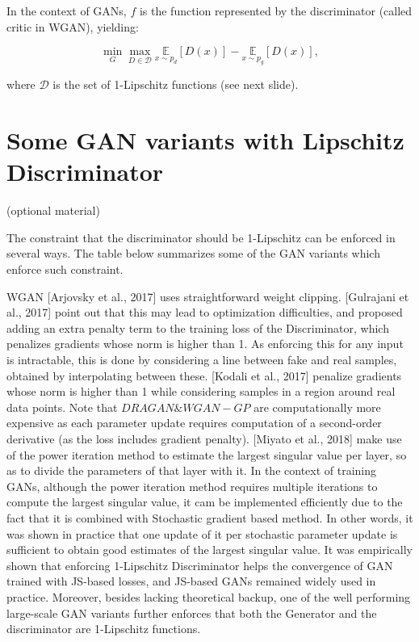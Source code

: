 \documentclass[10pt]{article}
\begin{document}
In the context of GANs, $f$ is the function represented by the discriminator (called critic in WGAN), yielding:

$$
\min _{G} \max _{D \in \mathcal{D}} \underset{x \sim p_{d}}{\mathbb{E}}[D(x)]-\underset{x \sim p_{g}}{\mathbb{E}}[D(x)],
$$

where $\mathcal{D}$ is the set of 1-Lipschitz functions (see next slide).

\section*{Some GAN variants with Lipschitz Discriminator}
(optional material)

The constraint that the discriminator should be 1-Lipschitz can be enforced in several ways. The table below summarizes some of the GAN variants which enforce such constraint.

WGAN [Arjovsky et al., 2017] uses straightforward weight clipping. [Gulrajani et al., 2017] point out that this may lead to optimization difficulties, and proposed adding an extra penalty term to the training loss of the Discriminator, which penalizes gradients whose norm is higher than 1. As enforcing this for any input is intractable, this is done by considering a line between fake and real samples, obtained by interpolating between these. [Kodali et al., 2017] penalize gradients whose norm is higher than 1 while considering samples in a region around real data points. Note that $D R A G A N \& W G A N-G P$ are computationally more expensive as each parameter update requires computation of a second-order derivative (as the loss includes gradient penalty). [Miyato et al., 2018] make use of the power iteration method to estimate the largest singular value per layer, so as to divide the parameters of that layer with it. In the context of training GANs, although the power iteration method requires multiple iterations to compute the largest singular value, it cam be implemented efficiently due to the fact that it is combined with Stochastic gradient based method. In other words, it was shown in practice that one update of it per stochastic parameter update is sufficient to obtain good estimates of the largest singular value. It was empirically shown that enforcing 1-Lipschitz Discriminator helps the convergence of GAN trained with JS-based losses, and JS-based GANs remained widely used in practice. Moreover, besides lacking theoretical backup, one of the well performing large-scale GAN variants further enforces that both the Generator and the discriminator are 1-Lipschitz functions.
\end{document}
